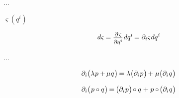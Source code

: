 ...

 ${\varsigma(q^i)}$

\nopagebreak\vspace{-0.4em}\begin{equation}
d\varsigma \hspace{-0.1ex}
= \scalebox{0.9}{$ \displaystyle\frac{\raisebox{-0.2em}{$\partial \hspace{.15ex} \varsigma$}}{\raisebox{-0.1em}{$\partial q^i$}} $} \hspace{.2ex} dq^i \hspace{-0.2ex}
= \partial_i \varsigma \hspace{.15ex} dq^i
\end{equation}

...


\nopagebreak\vspace{-0.4em}\begin{equation}\label{linearityordifferentiation}
\partial_i \bigl( \lambda \hspace{.1ex} p + \hspace{-0.2ex} \mu \hspace{.1ex} q \hspace{.1ex} \bigr) \hspace{-0.2ex}
= \lambda \bigl( \partial_i \hspace{.1ex} p \hspace{.1ex} \bigr) \hspace{-0.2ex} + \hspace{.1ex}
\mu \bigl( \partial_i \hspace{.1ex} q \hspace{.1ex} \bigr)
\end{equation}


\nopagebreak\vspace{-0.4em}\begin{equation}\label{productrulefordifferentiation}
\partial_i \bigl( \hspace{.15ex} p \circ q \hspace{.1ex} \bigr) \hspace{-0.2ex}
= \hspace{-0.2ex} \bigl( \partial_i \hspace{.1ex} p \hspace{.1ex} \bigr) \hspace{-0.25ex} \circ q \hspace{.12ex} +
\hspace{.1ex} p \circ \hspace{-0.25ex} \bigl( \partial_i \hspace{.1ex} q \hspace{.1ex} \bigr)
\end{equation}

